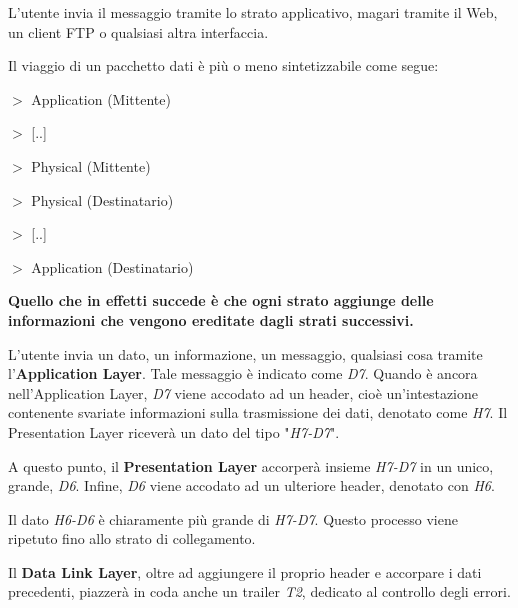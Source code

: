         L'utente invia il messaggio tramite lo strato applicativo, magari tramite il Web, un client FTP o qualsiasi altra interfaccia.
        
        \vspace{3mm}
        
        Il viaggio di un pacchetto dati è più o meno sintetizzabile come segue:
        
        \vspace{3mm}
        
        \(>\) Application (Mittente) 
        
        \(>\) [..] 
        
        \(>\) Physical (Mittente) 
        
        \(>\) Physical (Destinatario) 
        
        \(>\) [..] 
        
        \(>\) Application (Destinatario)
        
        \vspace{3mm}
        
        \textbf{Quello che in effetti succede è che ogni strato aggiunge delle informazioni che vengono ereditate dagli strati successivi.}
        
        L'utente invia un dato, un informazione, un messaggio, qualsiasi cosa tramite l'\textbf{Application Layer}. Tale messaggio è indicato come \textit{D7}. Quando è ancora nell'Application Layer, \textit{D7} viene accodato ad un header, cioè un'intestazione contenente svariate informazioni sulla trasmissione dei dati, denotato come \textit{H7}. Il Presentation Layer riceverà un dato del tipo "\textit{H7-D7}". 
        
        \vspace{3mm}
        
        A questo punto, il \textbf{Presentation Layer} accorperà insieme \textit{H7-D7} in un unico, grande, \textit{D6}. Infine, \textit{D6} viene accodato ad un ulteriore header, denotato con \textit{H6}. 
        
        \vspace{3mm}
        
        Il dato \textit{H6-D6} è chiaramente più grande di \textit{H7-D7}. Questo processo viene ripetuto fino allo strato di collegamento. 
        
        \vspace{3mm}
        
        Il \textbf{Data Link Layer}, oltre ad aggiungere il proprio header e accorpare i dati precedenti, piazzerà in coda anche un trailer \textit{T2}, dedicato al controllo degli errori. 
        
